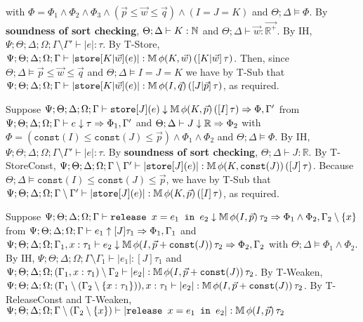   with $\Phi =  \Phi_1 \wedge \Phi_2 \wedge\Phi_3 \wedge  (\vec{p} \leq \vec{w} \leq \vec{q}) \wedge (I = J = K)$
  and $\Theta ; \Delta \vDash \Phi$. By \textbf{soundness of sort checking}, $\Theta ; \Delta \vdash K : \mathbb{N}$ and $\Theta ; \Delta \vdash \vec{w} : \vec{\mathbb{R}^+}$. By IH, $\Psi ; \Theta ; \Delta ; \Omega ; \Gamma \setminus \Gamma' \vdash |e| : \tau$. By T-Store,
   $\Psi ; \Theta ; \Delta ; \Omega ; \Gamma \vdash |\texttt{store}[K|\vec{w}](e)| : \mathbb{M} \, \phi(K,\vec{w}) \, ([K | \vec{w}] \, \tau)$. Then, since $\Theta ; \Delta \vDash \vec{p} \leq \vec{w} \leq \vec{q}$ and $\Theta ; \Delta \vDash I = J = K$ we have by T-Sub that $\Psi ; \Theta ; \Delta ; \Omega ; \Gamma \vdash |\texttt{store}[K|\vec{w}](e)| : \mathbb{M} \, \phi(I,\vec{q}) \, ([J | \vec{p}] \, \tau)$, as required.
  
  \item[AT-StoreConst] Suppose $\Psi ; \Theta ; \Delta ; \Omega ; \Gamma \vdash \texttt{store}[J](e) \downarrow \mathbb{M} \, \phi(K,\vec{p}) \, ([I] \, \tau) \Rightarrow \Phi, \Gamma'$ from $\Psi ; \Theta ; \Delta ; \Omega ; \Gamma \vdash e \downarrow \tau \Rightarrow \Phi_1,\Gamma'$ and
 $\Theta ; \Delta \vdash J \downarrow \mathbb{R} \Rightarrow \Phi_2$ 
 with $\Phi = (\texttt{const}(I) \leq \texttt{const}(J) \leq \vec{p}) \wedge \Phi_1 \wedge \Phi_2$ 
 and $\Theta ; \Delta \vDash \Phi$. 
 By IH, $\Psi ; \Theta ; \Delta ; \Omega ; \Gamma \setminus \Gamma' \vdash |e| : \tau$.  By \textbf{soundness of sort checking}, $\Theta ; \Delta \vdash J : \mathbb{R}$. By T-StoreConst, $\Psi ; \Theta ; \Delta ; \Omega ; \Gamma \setminus \Gamma' \vdash |\texttt{store}[J](e)| : \mathbb{M} \, \phi(K,\texttt{const}(J)) \, ([J] \, \tau)$. Because $\Theta ; \Delta \vDash \texttt{const}(I) \leq \texttt{const}(J) \leq \vec{p}$, we have by T-Sub that
 $\Psi ; \Theta ; \Delta ; \Omega ; \Gamma \setminus \Gamma' \vdash |\texttt{store}[J](e)| : \mathbb{M} \, \phi(K,\vec{p}) \, ([I] \, \tau)$, as required.
  
  \item[AT-ReleaseConst] Suppose $\Psi ; \Theta ; \Delta ; \Omega ; \Gamma \vdash \texttt{release } x = e_1 \texttt{ in }e_2 \downarrow \mathbb{M} \, \phi(I,\vec{p}) \, \tau_2 \Rightarrow \Phi_1 \wedge \Phi_2, \Gamma_2 \setminus \{x\}$
  from $\Psi ; \Theta ; \Delta ; \Omega ; \Gamma \vdash e_1 \uparrow [J] \tau_1 \Rightarrow \Phi_1,\Gamma_1$
  and $\Psi ; \Theta ; \Delta ; \Omega ; \Gamma_1, x : \tau_1 \vdash e_2 \downarrow \mathbb{M} \, \phi(I,\vec{p} + \texttt{const}(J)) \, \tau_2 \Rightarrow \Phi_2, \Gamma_2$
  with $\Theta ; \Delta \vDash \Phi_1 \wedge \Phi_2$.
  By IH, $\Psi ; \Theta ; \Delta ; \Omega ; \Gamma \setminus \Gamma_1 \vdash |e_1| : [J] \tau_1$
  and $\Psi ; \Theta ; \Delta ; \Omega ; (\Gamma_1, x : \tau_1) \setminus \Gamma_2 \vdash |e_2| : \mathbb{M} \, \phi(I,\vec{p} + \texttt{const}(J)) \, \tau_2$. By T-Weaken,
  $\Psi ; \Theta ; \Delta ; \Omega ; (\Gamma_1 \setminus (\Gamma_2 \setminus \{x : \tau_1\})), x :\tau_1\vdash |e_2| : \mathbb{M} \, \phi(I,\vec{p} + \texttt{const}(J)) \, \tau_2$. By T-ReleaseConst and T-Weaken, 
  $\Psi ; \Theta ; \Delta ; \Omega ; \Gamma \setminus (\Gamma_2 \setminus \{x\}) \vdash |\texttt{release } x = e_1 \texttt{ in }e_2| : \mathbb{M} \, \phi(I,\vec{p}) \, \tau_2$

